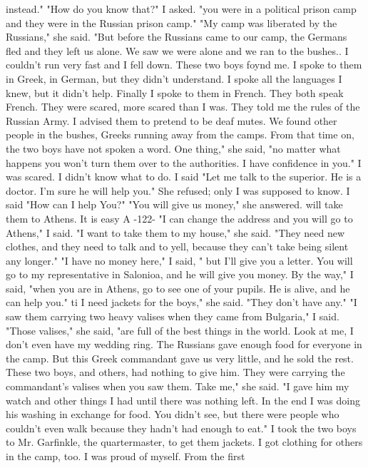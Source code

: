 instead." 
"How do you know that?" I asked. "you were in a political prison camp and they 
were in the Russian prison camp." 
"My camp was liberated by the Russians," she said. "But before the Russians 
came to our camp, the Germans fled and they left us alone. We saw we were alone and 
we ran to the bushes.. I couldn't run very fast and I fell down. These two boys 
foynd me. I spoke to them in Greek, in German, but they didn't understand. I spoke 
all the languages I knew, but it didn't help. Finally I spoke to them in French. 
They both speak French. They were scared, more scared than I was. They told me the 
rules of the Russian Army. I advised them to pretend to be deaf mutes. We found 
other people in the bushes, Greeks running away from the camps. From that time on, 
the two boys have not spoken a word. One thing," she said, "no matter what happens 
you won't turn them over to the authorities. I have confidence in you." 
I was scared. I didn't know what to do. I said "Let me talk to the superior. 
He is a doctor. I'm sure he will help you." She refused; only I was supposed to 
know. I said "How can I help You?" 
"You will give us money," she answered. will take them to Athens. It is easy 
A 
-122- 
"I can change the address and you will go to Athens," I said. 
"I want to take them to my house," she said. "They need new clothes, and they 
need to talk and to yell, because they can't take being silent any longer." 
"I have no money here," I said, " but I'll give you a letter. You will go to 
my representative in Salonioa, and he will give you money. By the way," I said, 
"when you are in Athens, go to see one of your pupils. He is alive, and he can help 
you." 
ti 
I need jackets for the boys," she said. "They don't have any." 
"I saw them carrying two heavy valises when they came from Bulgaria," I said. 
"Those valises," she said, "are full of the best things in the world. Look at 
me, I don't even have my wedding ring. The Russians gave enough food for everyone 
in the camp. But this Greek commandant gave us very little, and he sold the rest. 
These two boys, and others, had nothing to give him. They were carrying the 
commandant's valises when you saw them. Take me," she said. "I gave him my watch 
and other things I had until there was nothing left. In the end I was doing his 
washing in exchange for food. You didn't see, but there were people who couldn't even 
walk because they hadn't had enough to eat." 
I took the two boys to Mr. Garfinkle, the quartermaster, to get them jackets. I 
got clothing for others in the camp, too. I was proud of myself. From the first 
